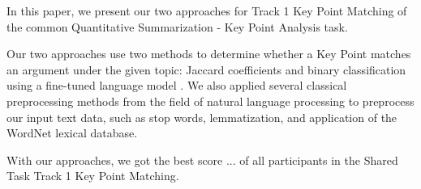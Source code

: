 In this paper, we present our two approaches for Track 1 Key Point Matching of the common Quantitative Summarization - Key Point Analysis task. 

Our two approaches use two methods to determine whether a Key Point matches an argument under the given topic: Jaccard coefficients and binary classification using a fine-tuned language model \Roberta. We also applied several classical preprocessing methods from the field of natural language processing to preprocess our input text data, such as stop words, lemmatization, and application of the WordNet lexical database.

With our approaches, we got the best score ... of all participants in the Shared Task Track 1 Key Point Matching.



